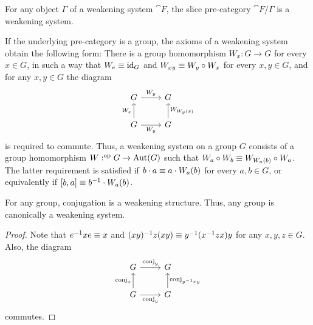 \begin{cor}
For any object $\Gamma$ of a weakening system $\cat{F}$, the slice pre-category
$\cat{F}/\Gamma$ is a weakening system.
\end{cor}

\begin{eg}
If the underlying pre-category is a group, the axioms of a weakening system
obtain the following form: There is a group homomorphism $W_x:G\to G$ for
every $x\in G$, in such a way that $W_e\equiv {\mathrm{id}_{G}}$ and $W_{xy}\equiv W_y\circ W_x$
for every $x,y\in G$, and for any $x,y\in G$ the diagram
\begin{equation*}
\begin{tikzcd}
G \arrow[r,"W_y"]
  &
G 
  \\
G \arrow[u,"W_x"]
  \arrow[r,swap,"W_y"]
  &
G \arrow[u,swap,"W_{W_y(x)}"]
\end{tikzcd}
\end{equation*}
is required to commute. Thus, a weakening system on a group $G$ consists of
a group homomorphism $W:^{\mathrm{op}} G\to\mathrm{Aut}(G)$ such that $W_a\circ W_b\equiv 
W_{W_a(b)}\circ W_a$. The latter requirement is satisfied if $b\cdot a\equiv a\cdot W_a(b)$
for every $a,b\in G$, or equivalently if $[b,a]\equiv b^{-1}\cdot W_a(b)$.
\end{eg}

\begin{lem}
For any group, conjugation is a weakening structure. Thus, any group is
canonically a weakening system.
\end{lem}

\begin{proof}
Note that $e^{-1}xe\equiv x$ and $(xy)^{-1}z(xy)\equiv y^{-1}(x^{-1}zx)y$ for any $x,y,z\in G$.
Also, the diagram
\begin{equation*}
\begin{tikzcd}
G \arrow[r,"\mathrm{conj}_y"]
  &
G 
  \\
G \arrow[u,"\mathrm{conj}_x"]
  \arrow[r,swap,"\mathrm{conj}_y"]
  &
G \arrow[u,swap,"\mathrm{conj}_{y^{-1}xy}"]
\end{tikzcd}
\end{equation*}
commutes.
\end{proof}

\begin{comment}
\begin{rmk}
Similarly, every groupoid has a canonical weakening structure given by
conjugation.
\end{rmk}
\end{comment}

